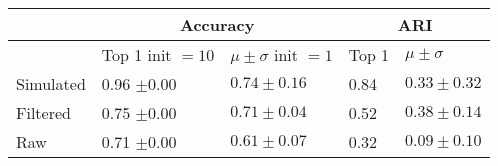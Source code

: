 \begin{tabular}{lllll}
\toprule
{} & \multicolumn{2}{c}{Accuracy} &   \multicolumn{2}{c}{ARI} \\
\midrule
{} & {\color{red}Top 1}{\color{blue} init $= 10$} &  {\color{red}$\mu \pm \sigma$}{\color{blue} init $= 1$} & Top 1 & $\mu \pm \sigma$ \\
Simulated &  0.96{\color{blue} $\pm 0.00$} &  $0.74 \pm 0.16 $  & 0.84 &  $0.33 \pm 0.32 $\\
Filtered  & 0.75{\color{blue} $\pm 0.00$} &  $0.71 \pm 0.04 $ & 0.52 &  $0.38 \pm 0.14 $\\
Raw & 0.71{\color{blue} $\pm 0.00$} &  $0.61 \pm 0.07 $ &  0.32 &  $0.09 \pm 0.10 $   \\
\bottomrule
\end{tabular}